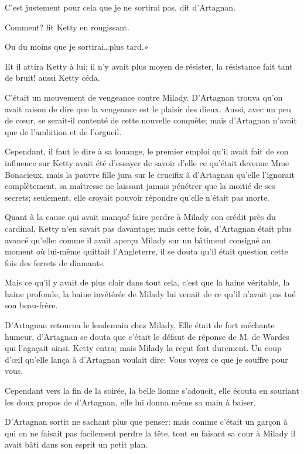 \speak  C'est justement pour cela que je ne sortirai pas, dit d'Artagnan. 

\speak  Comment? fit Ketty en rougissant. 

\speak  Ou du moins que je sortirai\dots plus tard.» 

Et il attira Ketty à lui; il n'y avait plus moyen de résister, la résistance fait tant de bruit! aussi Ketty céda. 

C'était un mouvement de vengeance contre Milady. D'Artagnan trouva qu'on avait raison de dire que la vengeance est le plaisir des dieux. Aussi, avec un peu de cœur, se serait-il contenté de cette nouvelle conquête; mais d'Artagnan n'avait que de l'ambition et de l'orgueil. 

Cependant, il faut le dire à sa louange, le premier emploi qu'il avait fait de son influence sur Ketty avait été d'essayer de savoir d'elle ce qu'était devenue Mme Bonacieux, mais la pauvre fille jura sur le crucifix à d'Artagnan qu'elle l'ignorait complètement, sa maîtresse ne laissant jamais pénétrer que la moitié de ses secrets; seulement, elle croyait pouvoir répondre qu'elle n'était pas morte. 

Quant à la cause qui avait manqué faire perdre à Milady son crédit près du cardinal, Ketty n'en savait pas davantage; mais cette fois, d'Artagnan était plus avancé qu'elle: comme il avait aperçu Milady sur un bâtiment consigné au moment où lui-même quittait l'Angleterre, il se douta qu'il était question cette fois des ferrets de diamants. 

Mais ce qu'il y avait de plus clair dans tout cela, c'est que la haine véritable, la haine profonde, la haine invétérée de Milady lui venait de ce qu'il n'avait pas tué son beau-frère. 

D'Artagnan retourna le lendemain chez Milady. Elle était de fort méchante humeur, d'Artagnan se douta que c'était le défaut de réponse de M. de Wardes qui l'agaçait ainsi. Ketty entra; mais Milady la reçut fort durement. Un coup d'œil qu'elle lança à d'Artagnan voulait dire: Vous voyez ce que je souffre pour vous. 

Cependant vers la fin de la soirée, la belle lionne s'adoucit, elle écouta en souriant les doux propos de d'Artagnan, elle lui donna même sa main à baiser. 

D'Artagnan sortit ne sachant plus que penser: mais comme c'était un garçon à qui on ne faisait pas facilement perdre la tête, tout en faisant sa cour à Milady il avait bâti dans son esprit un petit plan. 


